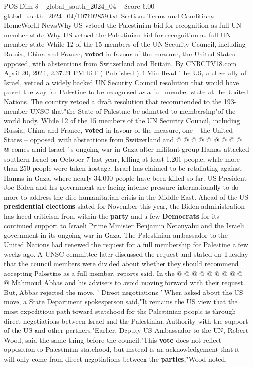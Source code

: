 \begin{textsample}{POS Dim 8 – global\_south\_2024\_04 – Score 6.00 – global\_south\_2024\_04/107602859.txt}  \label{ex:f8_pos_194}
Sections Terms and Conditions HomeWorld NewsWhy US vetoed the Palestinian bid for recognition as full UN member state Why US vetoed the Palestinian bid for recognition as full UN member state While 12 of the 15 members of the UN Security Council, including Russia, China and France, \textbf{voted} in favour of the measure, the United States opposed, with abstentions from Switzerland and Britain.
By CNBCTV18.com April 20, 2024, 2:37:21 PM IST ( Published ) 4 Min Read The US, a close ally of Israel, vetoed a widely backed UN Security Council resolution that would have paved the way for Palestine to be recognised as a full member state at the United Nations.
The country vetoed a draft resolution that recommended to the 193-member UNSC that"the State of Palestine be admitted to membership"of the world body.
While 12 of the 15 members of the UN Security Council, including Russia, China and France, \textbf{voted} in favour of the measure, one -- the United States -- opposed, with abstentions from Switzerland and @ @ @ @ @ @ @ @ @ @ comes amid Israel ' s ongoing war in Gaza after militant group Hamas attacked southern Israel on October 7 last year, killing at least 1,200 people, while more than 250 people were taken hostage.
Israel has claimed to be retaliating against Hamas in Gaza, where nearly 34,000 people have been killed so far.
US President Joe Biden and his government are facing intense pressure internationally to do more to address the dire humanitarian crisis in the Middle East.
Ahead of the US \textbf{presidential} \textbf{elections} slated for November this year, the Biden administration has faced criticism from within the \textbf{party} and a few \textbf{Democrats} for its continued support to Israeli Prime Minister Benjamin Netanyahu and the Israeli government in its ongoing war in Gaza.
The Palestinian ambassador to the United Nations had renewed the request for a full membership for Palestine a few weeks ago.
A UNSC committee later discussed the request and stated on Tuesday that the council members were divided about whether they should recommend accepting Palestine as a full member, reports said.
In the @ @ @ @ @ @ @ @ @ @ Mahmoud Abbas and his advisers to avoid moving forward with their request.
But, Abbas rejected the move. ' Direct negotiations ' When asked about the US move, a State Department spokesperson said,"It remains the US view that the most expeditious path toward statehood for the Palestinian people is through direct negotiations between Israel and the Palestinian Authority with the support of the US and other partners."Earlier, Deputy US Ambassador to the UN, Robert Wood, said the same thing before the council."This \textbf{vote} does not reflect opposition to Palestinian statehood, but instead is an acknowledgement that it will only come from direct negotiations between the \textbf{parties},"Wood noted.

\end{textsample}
